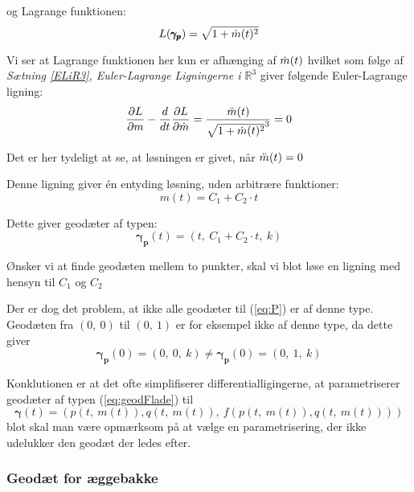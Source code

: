 og Lagrange funktionen:
\begin{equation*}
L(\pmb{\gamma_p}) = \sqrt{ 1 + \dot{m}(t)^2 }
\end{equation*}

Vi ser at Lagrange funktionen her kun er afhænging af \(\dot{m}(t)\)
hvilket som følge af \emph{Sætning \ref{ELiR3}, Euler-Lagrange Ligningerne i $\mathbb{R}^3$} giver følgende Euler-Lagrange ligning:
\begin{equation*}
\frac{\partial L}{\partial m} - \frac{d}{d t} \frac{\partial L}{\partial \dot{m}} = 
\frac{\ddot{m}(t)}{\sqrt{1 + \dot{m}(t)^2}^3} = 0\\
\end{equation*}

Det er her tydeligt at se, at løsningen er givet, når \(\ddot{m}(t) = 0\)

Denne ligning giver én entyding løsning, uden arbitrære funktioner:
\begin{equation*}
m(t) = C_1 + C_2 \cdot t
\end{equation*}

Dette giver geodæter af typen:
\begin{equation*}
\pmb{\gamma_p}(t) = (t,~C_1 + C_2 \cdot t,~k)
\end{equation*}
 
 Ønsker vi at finde geodæten mellem to punkter, skal vi blot løse en ligning med hensyn til \(C_1\) og \(C_2\)

 Der er dog det problem, at ikke alle geodæter til (\ref{eq:P}) er af denne type.
 Geodæten fra \((0,~0)\) til \((0,~1)\) er for eksempel ikke af denne type, da dette giver
 \begin{equation*}
 \pmb{\gamma_p}(0) = (0,~0,~k) \neq  \pmb{\gamma_p}(0) = (0,~1,~k)
 \end{equation*}

Konklutionen er at det ofte simplifiserer differentialligingerne,
at parametriserer geodæter af typen (\ref{eq:geodFlade}) til
\begin{equation*}
\pmb{\gamma}(t) = (p(t,~m(t)),q(t,~m(t)),~f(p(t,~m(t)),q(t,~m(t))))
\end{equation*}
blot skal man være opmærksom på at vælge en parametrisering, der ikke udelukker den geodæt der ledes efter.

\subsubsection{Geodæt for æggebakke }

